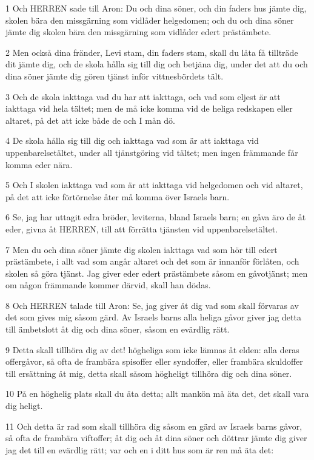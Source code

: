 \par 1 Och HERREN sade till Aron: Du och dina söner, och din faders hus jämte dig, skolen bära den missgärning som vidlåder helgedomen; och du och dina söner jämte dig skolen bära den missgärning som vidlåder edert prästämbete.
\par 2 Men också dina fränder, Levi stam, din faders stam, skall du låta få tillträde dit jämte dig, och de skola hålla sig till dig och betjäna dig, under det att du och dina söner jämte dig gören tjänst inför vittnesbördets tält.
\par 3 Och de skola iakttaga vad du har att iakttaga, och vad som eljest är att iakttaga vid hela tältet; men de må icke komma vid de heliga redskapen eller altaret, på det att icke både de och I mån dö.
\par 4 De skola hålla sig till dig och iakttaga vad som är att iakttaga vid uppenbarelsetältet, under all tjänstgöring vid tältet; men ingen främmande får komma eder nära.
\par 5 Och I skolen iakttaga vad som är att iakttaga vid helgedomen och vid altaret, på det att icke förtörnelse åter må komma över Israels barn.
\par 6 Se, jag har uttagit edra bröder, leviterna, bland Israels barn; en gåva äro de åt eder, givna åt HERREN, till att förrätta tjänsten vid uppenbarelsetältet.
\par 7 Men du och dina söner jämte dig skolen iakttaga vad som hör till edert prästämbete, i allt vad som angår altaret och det som är innanför förlåten, och skolen så göra tjänst. Jag giver eder edert prästämbete såsom en gåvotjänst; men om någon främmande kommer därvid, skall han dödas.
\par 8 Och HERREN talade till Aron: Se, jag giver åt dig vad som skall förvaras av det som gives mig såsom gärd. Av Israels barns alla heliga gåvor giver jag detta till ämbetslott åt dig och dina söner, såsom en evärdlig rätt.
\par 9 Detta skall tillhöra dig av det! högheliga som icke lämnas åt elden: alla deras offergåvor, så ofta de frambära spisoffer eller syndoffer, eller frambära skuldoffer till ersättning åt mig, detta skall såsom högheligt tillhöra dig och dina söner.
\par 10 På en höghelig plats skall du äta detta; allt mankön må äta det, det skall vara dig heligt.
\par 11 Och detta är rad som skall tillhöra dig såsom en gärd av Israels barns gåvor, så ofta de frambära viftoffer; åt dig och åt dina söner och döttrar jämte dig giver jag det till en evärdlig rätt; var och en i ditt hus som är ren må äta det:
